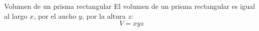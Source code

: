 
\begin{infocard}{Volumen de un prisma rectangular}
    El volumen de un prisma rectangular es igual al largo $x$, por el ancho $y$, por la altura $z$:
    \[ V = xyz \]
\end{infocard}



